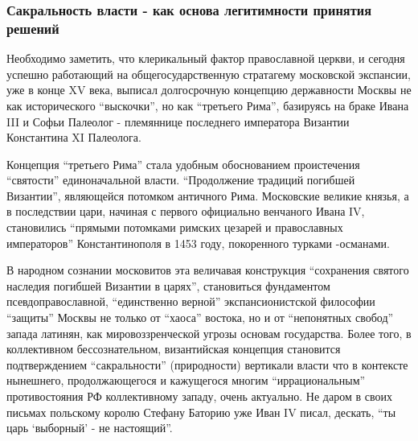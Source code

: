  
 
 
 
 

\subsubsection{Сакральность власти - как основа легитимности принятия решений}

Необходимо заметить, что клерикальный фактор православной церкви, и сегодня
успешно работающий на общегосударственную стратагему московской экспансии, уже
в конце XV века, выписал долгосрочную концепцию державности Москвы не как
исторического \enquote{выскочки}, но как \enquote{третьего Рима}, базируясь на
браке Ивана III и Софьи Палеолог - племяннице последнего императора Византии
Константина XI Палеолога.

Концепция \enquote{третьего Рима} стала удобным обоснованием проистечения
\enquote{святости} единоначальной власти. \enquote{Продолжение традиций
погибшей Византии}, являющейся потомком античного Рима. Московские великие
князья, а в последствии цари, начиная с первого официально венчаного Ивана IV,
становились \enquote{прямыми потомками римских цезарей и православных
императоров} Константинополя в 1453 году, покоренного турками -османами.

В народном сознании московитов эта величавая конструкция \enquote{сохранения
святого наследия погибшей Византии в царях}, становиться фундаментом
псевдоправославной, \enquote{единственно верной} экспансионистской философии
\enquote{защиты} Москвы не только от \enquote{хаоса} востока, но и от
\enquote{непонятных свобод} запада латинян, как мировоззренческой угрозы
основам государства. Более того, в коллективном бессознательном, византийская
концепция становится подтверждением \enquote{сакральности} (природности)
вертикали власти что в контексте нынешнего, продолжающегося и кажущегося многим
\enquote{иррациональным} противостояния РФ коллективному западу, очень
актуально. Не даром в своих письмах польскому королю Стефану Баторию уже Иван
IV писал, дескать, \enquote{ты царь \enquote{выборный} - не настоящий}.

